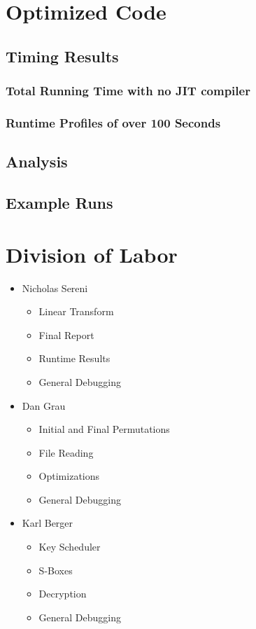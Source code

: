 \documentclass[12pt]{article} %
\begin{document}
\section{Optimized Code}
\subsection{Timing Results}
\subsubsection{Total Running Time with no JIT compiler}
\subsubsection{Runtime Profiles of over 100 Seconds}
\subsection{Analysis}
\subsection{Example Runs}

\section{Division of Labor}
\begin{itemize}
 \item Nicholas Sereni
 \begin{itemize}
  \item{Linear Transform}
  \item{Final Report}
  \item{Runtime Results}
  \item{General Debugging}
 \end{itemize}
 \item{Dan Grau}
 \begin{itemize}
  \item{Initial and Final Permutations}
  \item{File Reading}
  \item{Optimizations}
  \item{General Debugging}
 \end{itemize}
 \item{Karl Berger}
 \begin{itemize}
  \item{Key Scheduler}
  \item{S-Boxes}
  \item{Decryption}
  \item{General Debugging}
 \end{itemize}
\end{itemize}
\end{document}
